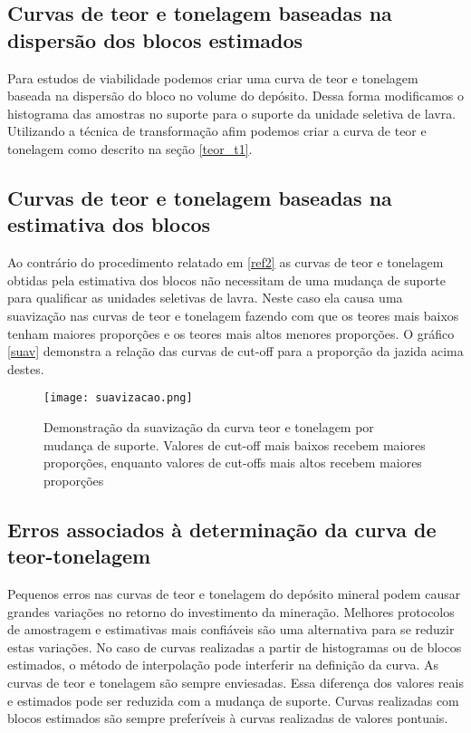 \subsection{Curvas de teor e tonelagem baseadas na dispersão dos blocos estimados} \label{ref2}

Para estudos de viabilidade podemos criar uma curva de teor e tonelagem baseada na dispersão do bloco no volume do depósito. Dessa forma modificamos o histograma das amostras no suporte para o suporte da unidade seletiva de lavra. Utilizando a técnica de transformação afim podemos criar a curva de teor e tonelagem como descrito na seção \eqref{teor_t1}.

\subsection{Curvas de teor e tonelagem baseadas na estimativa dos blocos}

Ao contrário do procedimento relatado em \eqref{ref2} as curvas de teor e tonelagem obtidas pela estimativa dos blocos não necessitam de uma mudança de suporte para qualificar as unidades seletivas de lavra. Neste caso ela causa uma suavização nas curvas de teor e tonelagem fazendo com que os teores mais baixos tenham maiores proporções e os teores mais altos menores proporções. O gráfico \eqref{suav} demonstra a relação das curvas de cut-off para a proporção da jazida acima destes. 


\begin{figure}[H]
	\centering
	\texttt{[image: suavizacao.png]}	
	\caption{Demonstração da suavização da curva teor e tonelagem por mudança de suporte. Valores de cut-off mais baixos recebem maiores proporções, enquanto valores de cut-offs mais altos recebem maiores proporções}
	\label{suav}
\end{figure} 
 
 \subsection{Erros associados à determinação da curva de teor-tonelagem}
 
 Pequenos erros nas curvas de teor e tonelagem do depósito mineral podem causar grandes variações no retorno do investimento da mineração. Melhores protocolos de amostragem e estimativas mais confiáveis são uma alternativa para se reduzir estas variações. No caso de curvas realizadas a partir de histogramas ou de blocos estimados, o método de interpolação pode interferir na definição da curva. As curvas de teor e tonelagem são sempre enviesadas. Essa diferença dos valores reais e estimados pode ser reduzida com a mudança de suporte. Curvas realizadas com blocos estimados são sempre preferíveis à curvas realizadas de valores pontuais. 
  
